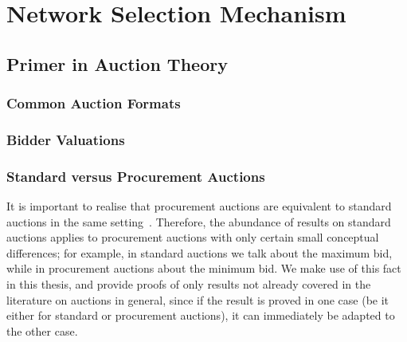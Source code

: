 \section{Network Selection Mechanism} %
\label{sec:network_selection_mechanism_dmp}

\subsection{Primer in Auction Theory} %
\label{sub:primer_in_auction_theory_dmp}

\subsubsection{Common Auction Formats} %
\label{ssub:common_auction_formats_dmp}


\subsubsection{Bidder Valuations} %
\label{ssub:bidder_valuations_dmp}


\subsubsection{Standard versus Procurement Auctions} %
\label{ssub:standard_versus_procurement_auctions_dmp}
It is important to realise that procurement auctions are equivalent to standard auctions in the same setting~\cite{Krishna10}. Therefore, the abundance of results on standard auctions applies to procurement auctions with only certain small conceptual differences; for example, in standard auctions we talk about the maximum bid, while in procurement auctions about the minimum bid. We make use of this fact in this thesis, and provide proofs of only results not already covered in the literature on auctions in general, since if the result is proved in one case (be it either for standard or procurement auctions), it can immediately be adapted to the other case.

